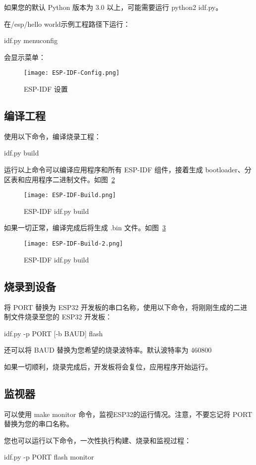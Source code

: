 如果您的默认 Python 版本为 3.0 以上，可能需要运行 python2 idf.py。


在/esp/hello world示例工程路径下运行：

\begin{tcolorbox}
    idf.py menuconfig
\end{tcolorbox}

会显示菜单：

\begin{figure}[htbp]
    \centering
    \texttt{[image: ESP-IDF-Config.png]}
    \caption{ESP-IDF 设置}
    \label{ESP-IDF-Config}
\end{figure}

\subsection{编译工程}

使用以下命令，编译烧录工程：

\begin{tcolorbox}
    idf.py build
\end{tcolorbox}

运行以上命令可以编译应用程序和所有 ESP-IDF 组件，接着生成 bootloader、分区表和应用程序二进制文件。如图~\ref{fig:ESP-IDF-Build}

\begin{figure}[htbp]
    \centering
    \texttt{[image: ESP-IDF-Build.png]}
    \caption{ESP-IDF idf.py build}
    \label{fig:ESP-IDF-Build}
\end{figure}

如果一切正常，编译完成后将生成 .bin 文件。如图~\ref{fig:ESP-IDF-Build-2}

\begin{figure}[htbp]
    \centering
    \texttt{[image: ESP-IDF-Build-2.png]}
    \caption{ESP-IDF idf.py build}
    \label{fig:ESP-IDF-Build-2}
\end{figure}

\subsection{烧录到设备}

将 PORT 替换为 ESP32 开发板的串口名称，使用以下命令，将刚刚生成的二进制文件烧录至您的 ESP32 开发板：

\begin{tcolorbox}
    idf.py -p PORT [-b BAUD] flash
\end{tcolorbox}

还可以将 BAUD 替换为您希望的烧录波特率。默认波特率为 460800

如果一切顺利，烧录完成后，开发板将会复位，应用程序开始运行。

\subsection{监视器}

可以使用 make monitor 命令，监视ESP32的运行情况。注意，不要忘记将 PORT 替换为您的串口名称。

您也可以运行以下命令，一次性执行构建、烧录和监视过程：

\begin{tcolorbox}
    idf.py -p PORT flash monitor
\end{tcolorbox}
